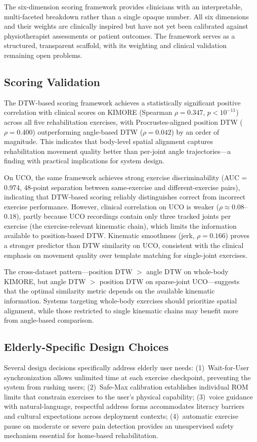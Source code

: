 The six-dimension scoring framework provides clinicians with an interpretable, multi-faceted breakdown rather than a single opaque number. All six dimensions and their weights are clinically inspired but have not yet been calibrated against physiotherapist assessments or patient outcomes. The framework serves as a structured, transparent scaffold, with its weighting and clinical validation remaining open problems.

\subsection{Scoring Validation}
The DTW-based scoring framework achieves a statistically significant positive correlation with clinical scores on KIMORE (Spearman $\rho = 0.347$, $p < 10^{-11}$) across all five rehabilitation exercises, with Procrustes-aligned position DTW ($\rho = 0.400$) outperforming angle-based DTW ($\rho = 0.042$) by an order of magnitude. This indicates that body-level spatial alignment captures rehabilitation movement quality better than per-joint angle trajectories---a finding with practical implications for system design.

On UCO, the same framework achieves strong exercise discriminability (AUC = 0.974, 48-point separation between same-exercise and different-exercise pairs), indicating that DTW-based scoring reliably distinguishes correct from incorrect exercise performance. However, clinical correlation on UCO is weaker ($\rho \approx 0.08$--$0.18$), partly because UCO recordings contain only three tracked joints per exercise (the exercise-relevant kinematic chain), which limits the information available to position-based DTW. Kinematic smoothness (jerk, $\rho = 0.166$) proves a stronger predictor than DTW similarity on UCO, consistent with the clinical emphasis on movement quality over template matching for single-joint exercises.

The cross-dataset pattern---position DTW $>$ angle DTW on whole-body KIMORE, but angle DTW $>$ position DTW on sparse-joint UCO---suggests that the optimal similarity metric depends on the available kinematic information. Systems targeting whole-body exercises should prioritize spatial alignment, while those restricted to single kinematic chains may benefit more from angle-based comparison.

\subsection{Elderly-Specific Design Choices}
Several design decisions specifically address elderly user needs: (1)~Wait-for-User synchronization allows unlimited time at each exercise checkpoint, preventing the system from rushing users; (2)~Safe-Max calibration establishes individual ROM limits that constrain exercises to the user's physical capability; (3)~voice guidance with natural-language, respectful address forms accommodates literacy barriers and cultural expectations across deployment contexts; (4)~automatic exercise pause on moderate or severe pain detection provides an unsupervised safety mechanism essential for home-based rehabilitation.

